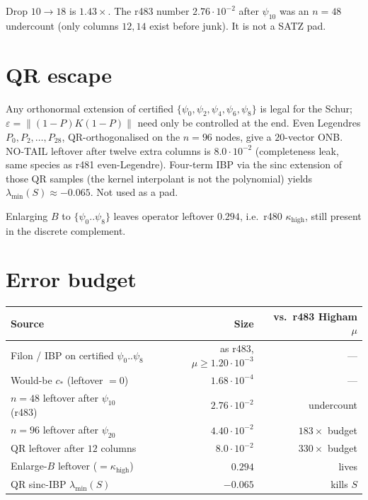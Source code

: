 \documentclass[11pt]{article}
\theoremstyle{remark}
\begin{document}
Drop $10\to18$ is $1.43\times$.
The r483 number $2.76\cdot10^{-2}$ after $\psi_{10}$
was an $n=48$ undercount (only columns $12,14$ exist
before junk).
It is not a SATZ pad.

\section{QR escape}

Any orthonormal extension of certified
$\{\psi_0,\psi_2,\psi_4,\psi_6,\psi_8\}$ is legal for
the Schur; $\varepsilon=\|(1-P)K(1-P)\|$ need only
be controlled at the end.
Even Legendres $P_{0},P_{2},\dots,P_{28}$,
QR-orthogonalised on the $n=96$ nodes, give a
$20$-vector ONB.
NO-TAIL leftover after twelve extra columns is
$8.0\cdot10^{-2}$ (completeness leak, same species as
r481 even-Legendre).
Four-term IBP via the sinc extension of those
QR samples (the kernel interpolant is not the
polynomial) yields $\lambda_{\min}(S)\approx-0.065$.
Not used as a pad.

Enlarging $B$ to $\{\psi_0..\psi_8\}$ leaves
operator leftover $0.294$, i.e.\ r480
$\kappa_{\mathrm{high}}$, still present in the
discrete complement.

\section{Error budget}

\begin{center}
\small
\begin{tabular}{@{}lrr@{}}
\toprule
Source & Size & vs.\ r483 Higham $\mu$ \\
\midrule
Filon / IBP on certified $\psi_0..\psi_8$
  & as r483, $\mu\ge1.20\cdot10^{-3}$ & --- \\
Would-be $c_*$ (leftover $=0$) & $1.68\cdot10^{-4}$ & --- \\
$n=48$ leftover after $\psi_{10}$ (r483)
  & $2.76\cdot10^{-2}$ & undercount \\
$n=96$ leftover after $\psi_{20}$
  & $4.40\cdot10^{-2}$ & $183\times$ budget \\
QR leftover after $12$ columns
  & $8.0\cdot10^{-2}$ & $330\times$ budget \\
Enlarge-$B$ leftover ($=\kappa_{\mathrm{high}}$)
  & $0.294$ & lives \\
QR sinc-IBP $\lambda_{\min}(S)$
  & $-0.065$ & kills $S$ \\
\bottomrule
\end{tabular}
\end{center}
\end{document}
